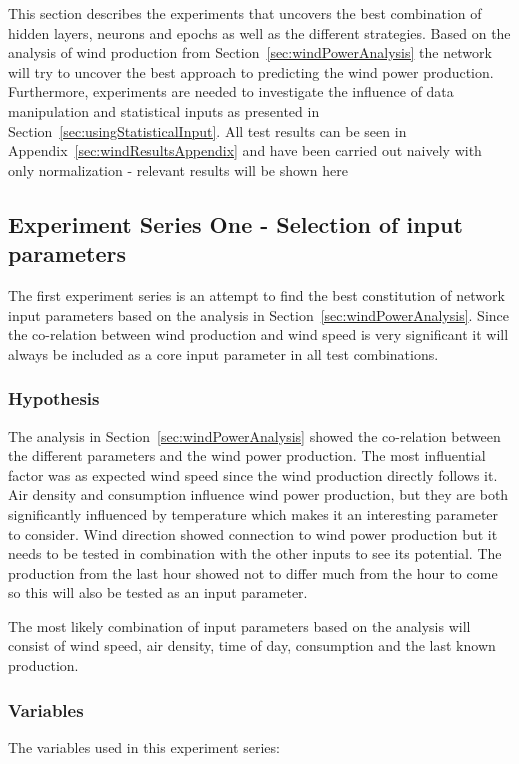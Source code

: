 This section describes the experiments that uncovers the best combination of hidden layers, neurons and epochs as well as the different strategies. Based on the analysis of wind production from Section~\ref{sec:windPowerAnalysis} the network will try to uncover the best approach to predicting the wind power production. Furthermore, experiments are needed to investigate the influence of data manipulation and statistical inputs as presented in Section~\ref{sec:usingStatisticalInput}. All test results can be seen in Appendix~\ref{sec:windResultsAppendix} and have been carried out naively with only normalization - relevant results will be shown here 


\subsection{Experiment Series One - Selection of input parameters}
The first experiment series is an attempt to find the best constitution of network input parameters based on the analysis in Section~\ref{sec:windPowerAnalysis}. Since the co-relation between wind production and wind speed is very significant it will always be included as a core input parameter in all test combinations.

\subsubsection{Hypothesis}
The analysis in Section~\ref{sec:windPowerAnalysis} showed the co-relation between the different parameters and the wind power production. The most influential factor was as expected wind speed since the wind production directly follows it. Air density and consumption influence wind power production, but they are  both significantly influenced by temperature which makes it an interesting parameter to consider. Wind direction showed connection to wind power production but it needs to be tested in combination with the other inputs to see its potential. The production from the last hour showed not to differ much from the hour to come so this will also be tested as an input parameter.

The most likely combination of input parameters based on the analysis will consist of wind speed, air density, time of day, consumption and the last known production.

\subsubsection{Variables}
The variables used in this experiment series:

